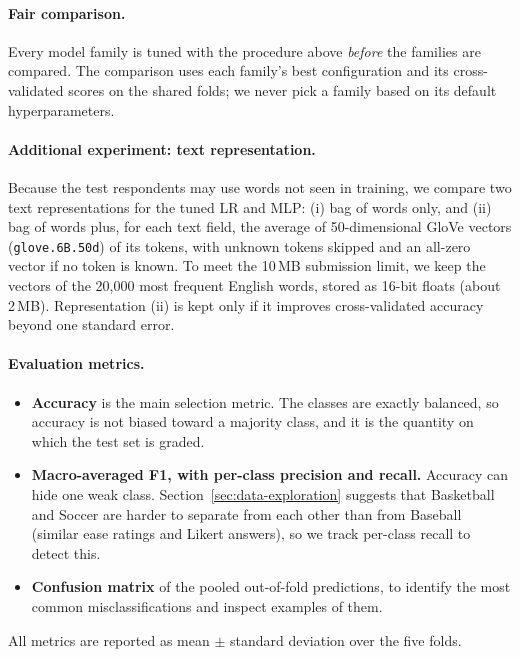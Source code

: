 \documentclass[11pt,titlepage]{article}
\begin{document}
\paragraph{Fair comparison.}
Every model family is tuned with the procedure above \emph{before} the families are
compared. The comparison uses each family's best configuration and its
cross-validated scores on the shared folds; we never pick a family based on its
default hyperparameters.

\paragraph{Additional experiment: text representation.}
Because the test respondents may use words not seen in training, we compare two
text representations for the tuned LR and MLP: (i) bag of words only, and
(ii) bag of words plus, for each text field, the average of 50-dimensional GloVe
vectors (\texttt{glove.6B.50d}) of its tokens, with unknown tokens skipped and an
all-zero vector if no token is known. To meet the 10\,MB submission limit, we keep
the vectors of the 20{,}000 most frequent English words, stored as 16-bit floats
(about 2\,MB). Representation (ii) is kept only if it improves cross-validated
accuracy beyond one standard error.

\paragraph{Evaluation metrics.}
\begin{itemize}\itemsep0pt
\item \textbf{Accuracy} is the main selection metric. The classes are exactly
balanced, so accuracy is not biased toward a majority class, and it is the
quantity on which the test set is graded.
\item \textbf{Macro-averaged F1, with per-class precision and recall.} Accuracy can
hide one weak class. Section~\ref{sec:data-exploration} suggests that Basketball
and Soccer are harder to separate from each other than from Baseball (similar ease
ratings and Likert answers), so we track per-class recall to detect this.
\item \textbf{Confusion matrix} of the pooled out-of-fold predictions, to identify
the most common misclassifications and inspect examples of them.
\end{itemize}
All metrics are reported as mean $\pm$ standard deviation over the five folds.
\end{document}
